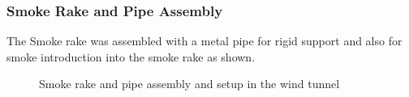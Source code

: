 \subsubsection{Smoke Rake and Pipe Assembly}
The Smoke rake was assembled with a metal pipe for rigid support and also for smoke introduction into the
smoke rake as shown.
\begin{figure}[!htb]%
	\centering
	\qquad
	\caption[Final rake and pipe]{Smoke rake and pipe assembly and setup in the wind tunnel}%
	\label{fig:result1}%
\end{figure}
